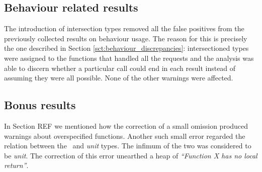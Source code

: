 \subsection{Behaviour related results}

The introduction of intersection types removed all the false positives
from the previously collected results on behaviour usage. The reason
for this is precisely the one described in Section
\ref{sct:behaviour_discrepancies}: intersectioned types were assigned
to the functions that handled all the requests and the analysis was
able to discern whether a particular call could end in each result
instead of assuming they were all possible. None of the other warnings
were affected.

\subsection{Bonus results}

In Section REF we mentioned how the correction of a small omission
produced warnings about overspecified functions. Another such small
error regarded the relation between the \none\ and \emph{unit}
types. The infimum of the two was considered to be \emph{unit}. The
correction of this error unearthed a heap of \emph{``Function X has no
  local return''}.
